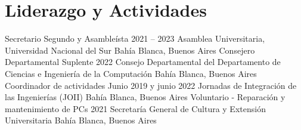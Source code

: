 \section{Liderazgo y Actividades}
\resumeSubHeadingListStart
    \resumeSubheading
      {Secretario Segundo y Asambleísta}
      {2021 -- 2023}
      {Asamblea Universitaria, Universidad Nacional del Sur}
      {Bahía Blanca, Buenos Aires}
    \resumeSubheading
      {Consejero Departamental Suplente}
      {2022}
      {Consejo Departamental del Departamento de Ciencias e Ingeniería de la Computación}
      {Bahía Blanca, Buenos Aires}
    \resumeSubheading
      {Coordinador de actividades}
      {Junio 2019 y junio 2022}
      {Jornadas de Integración de las Ingenierías (JOII)}
      {Bahía Blanca, Buenos Aires}
    \resumeSubheading
      {Voluntario - Reparación y mantenimiento de PCs}
      {2021}
      {Secretaría General de Cultura y Extensión Universitaria}
      {Bahía Blanca, Buenos Aires}
      \resumeItemListStart
      \resumeItemListEnd
  \resumeSubHeadingListEnd
